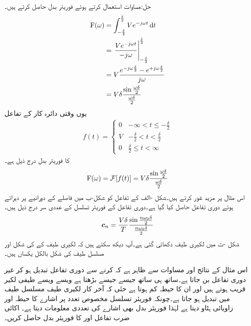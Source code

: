 حل:مساوات  استعمال کرتے ہوئے فوریئر بدل حاصل کرتے ہیں۔
\begin{align*}
\bF(\omega)&=\int_{-\frac{\delta}{2}}^{\frac{\delta}{2}} V e^{-j\omega t} \dif t\\
&=\left. \frac{V e^{-j\omega t}}{-j\omega}\right|_{-\frac{\delta}{2}}^{\frac{\delta}{2}}\\
&=V\frac{e^{-j\omega \frac{\delta}{2}}-e^{+j\omega \frac{\delta}{2}}}{j\omega}\\
&=V \delta \frac{\sin \frac{\omega \delta}{2}}{\frac{\omega \delta}{2}}
\end{align*}
یوں وقتی دائرہ کار کے تفاعل 
\begin{align}
f(t)=
\begin{cases}
0 & -\infty < t \le -\frac{\delta}{2}\\
V & -\frac{\delta}{2} < t < \frac{\delta}{2}\\
0& \frac{\delta}{2} \le t < \infty
\end{cases}
\end{align}
کا فوریئر بدل  درج ذیل ہے۔
\begin{align}
{\ensuremath{{\textup{F}}}}(\omega)=\mathcal{F}[f(t)]=V \delta \frac{\sin \frac{\omega \delta}{2}}{\frac{\omega \delta}{2}}
\end{align}
اس مثال پر مزید غور کرتے ہیں۔شکل -الف کے تفاعل کو شکل-ب میں  فاصلے کے دورانیے پر دہراتے ہوئے  دوری تفاعل  حاصل کیا گیا ہے۔دوری تفاعل  کے فوریئر تسلسل کے عددی سر درج ذیل ہیں۔
\begin{align}
{\ensuremath{{\boldsymbol{c}}}}_n=\frac{V \delta}{T} \frac{\sin\frac{n\omega_0 \delta}{2}}{\frac{n\omega_0 \delta}{2}}
\end{align}
شکل -ت میں لکیری طیف دکھائی گئی ہے۔آپ دیکھ سکتے ہیں کہ  لکیری طیف کے  کی شکل اور مسلسل طیف کی شکل بالکل یکساں ہیں۔

اس مثال کے نتائج اور مساوات سے ظاہر ہے کہ  کرنے سے دوری تفاعل تبدیل ہو کر غیر دوری تفاعل بن جاتا ہے۔ساتھ ہی ساتھ جیسے جیسے  بڑھتا ہے ویسے ویسے طیفی لکیر قریب ہوتے ہیں اور ان کا حیطہ کم  ہوتا ہے حتٰی کہ آخر کار لکیری طیف مسلسل طیف میں تبدیل ہو جاتا ہے۔چونکہ فوریئر تسلسل مخصوص تعدد پر اشارے کا حیطہ اور زاویائی ہٹاو دیتا ہے لہٰذا فوریئر بدل بھی اشارے کی تعددی معلومات دیتا ہے۔ 
اکائی ضرب تفاعل  اور  کا فوریئر بدل حاصل کریں۔

